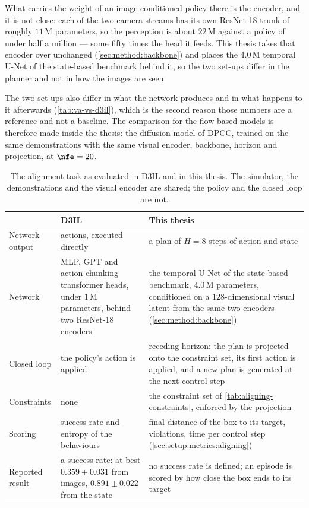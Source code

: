 What carries the weight of an image-conditioned policy there is the encoder, and it is not close: each of
the two camera streams has its own ResNet-18 trunk of roughly $11$\,M parameters, so the perception is
about $22$\,M against a policy of under half a million --- some fifty times the head it feeds. This thesis
takes that encoder over unchanged (\autoref{sec:method:backbone}) and places the $4.0$\,M temporal U-Net
of the state-based benchmark behind it, so the two set-ups differ in the planner and not in how the
images are seen.

The two set-ups also differ in what the network produces and in what happens to it afterwards
(\autoref{tab:va-vs-d3il}), which is the second reason those numbers are a reference and not a baseline. The comparison for the flow-based models is therefore made inside the thesis:
the diffusion model of \ac{DPCC}, trained on the same demonstrations with the same visual encoder,
backbone, horizon and projection, at $\nfe=20$.

\begin{table}[htpb]
  \caption[Alignment set-up against D3IL]{The alignment task as evaluated in D3IL and in this thesis.
  The simulator, the demonstrations and the visual encoder are shared; the policy and the closed loop are
  not.}
  \label{tab:va-vs-d3il}
  \centering
  \small
  \begin{tabularx}{\linewidth}{@{}p{2.6cm} L L@{}}
    \toprule
    & D3IL \parencite{jia2024towards} & This thesis \\
    \midrule
    Network output & actions, executed directly & a plan of $H=8$ steps of action and state \\
    \addlinespace[4pt]
    Network        & MLP, GPT and action-chunking transformer heads, under $1$\,M parameters, behind two ResNet-18 encoders & the temporal U-Net of the state-based benchmark, $4.0$\,M parameters, conditioned on a $128$-dimensional visual latent from the same two encoders (\autoref{sec:method:backbone}) \\
    \addlinespace[4pt]
    Closed loop    & the policy's action is applied & receding horizon: the plan is projected onto the constraint set, its first action is applied, and a new plan is generated at the next control step \\
    \addlinespace[4pt]
    Constraints    & none & the constraint set of \autoref{tab:aligning-constraints}, enforced by the projection \\
    \addlinespace[4pt]
    Scoring        & success rate and entropy of the behaviours & final distance of the box to its target, violations, time per control step (\autoref{sec:setup:metrics:aligning}) \\
    \addlinespace[4pt]
    Reported result & a success rate: at best $0.359 \pm 0.031$ from images, $0.891 \pm 0.022$ from the state & no success rate is defined; an episode is scored by how close the box ends to its target \\
    \bottomrule
  \end{tabularx}
\end{table}
\FloatBarrier

